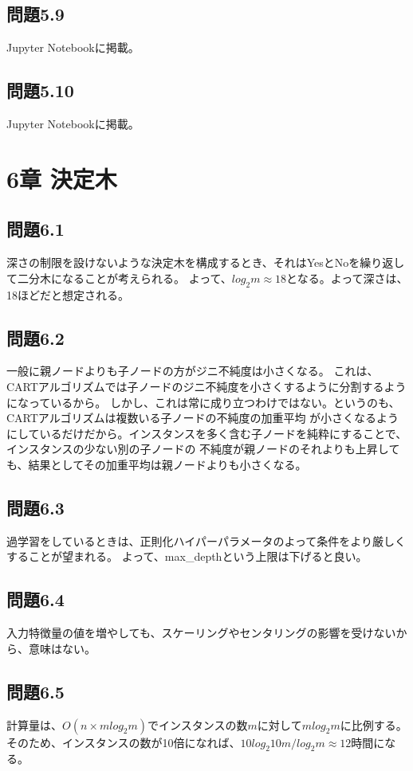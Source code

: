 \documentclass[a4j,twocolumn]{jsarticle}
\begin{document}
\subsection{問題5.9}
Jupyter Notebookに掲載。

\subsection{問題5.10}
Jupyter Notebookに掲載。

\section{6章 決定木}
\subsection{問題6.1}
深さの制限を設けないような決定木を構成するとき、それはYesとNoを繰り返して二分木になることが考えられる。
よって、$log_{2}m \approx 18$となる。よって深さは、18ほどだと想定される。

\subsection{問題6.2}
一般に親ノードよりも子ノードの方がジニ不純度は小さくなる。
これは、CARTアルゴリズムでは子ノードのジニ不純度を小さくするように分割するようになっているから。
しかし、これは常に成り立つわけではない。というのも、CARTアルゴリズムは複数いる子ノードの不純度の加重平均
が小さくなるようにしているだけだから。インスタンスを多く含む子ノードを純粋にすることで、インスタンスの少ない別の子ノードの
不純度が親ノードのそれよりも上昇しても、結果としてその加重平均は親ノードよりも小さくなる。

\subsection{問題6.3}
過学習をしているときは、正則化ハイパーパラメータのよって条件をより厳しくすることが望まれる。
よって、max\_depthという上限は下げると良い。

\subsection{問題6.4}
入力特徴量の値を増やしても、スケーリングやセンタリングの影響を受けないから、意味はない。

\subsection{問題6.5}
計算量は、$O(n\times mlog_{2}m)$でインスタンスの数$mに対してmlog_{2}m$に比例する。
そのため、インスタンスの数が10倍になれば、$10log_{2}10m / log_{2}m \approx 12$時間になる。
\end{document}
